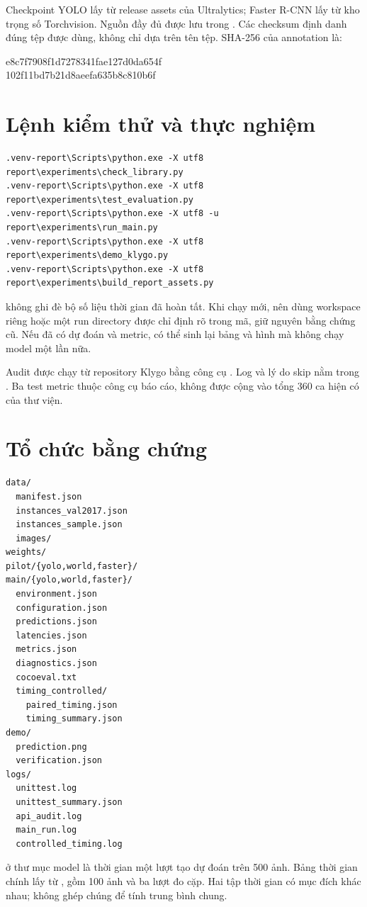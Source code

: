 Checkpoint YOLO lấy từ release assets của Ultralytics; Faster R-CNN lấy từ kho trọng số Torchvision. Nguồn đầy đủ được lưu trong . Các checksum định danh đúng tệp được dùng, không chỉ dựa trên tên tệp. SHA-256 của annotation là:
\begin{center}\footnotesize\ttfamily
e8c7f7908f1d7278341fae127d0da654f\\
102f11bd7b21d8aeefa635b8c810b6f
\end{center}
\begin{table}[H]\centering\footnotesize
\caption{SHA-256 của ba checkpoint; mỗi hash được chia hai dòng}

\end{table}

\section{Lệnh kiểm thử và thực nghiệm}
\label{sec:reproduce}
\begin{lstlisting}[language={},caption={Các lệnh dùng cho kết quả báo cáo}]
.venv-report\Scripts\python.exe -X utf8 report\experiments\check_library.py
.venv-report\Scripts\python.exe -X utf8 report\experiments\test_evaluation.py
.venv-report\Scripts\python.exe -X utf8 -u report\experiments\run_main.py
.venv-report\Scripts\python.exe -X utf8 report\experiments\demo_klygo.py
.venv-report\Scripts\python.exe -X utf8 report\experiments\build_report_assets.py
\end{lstlisting}
 không ghi đè bộ số liệu thời gian đã hoàn tất. Khi chạy mới, nên dùng workspace riêng hoặc một run directory được chỉ định rõ trong mã, giữ nguyên bằng chứng cũ. Nếu đã có dự đoán và metric, có thể sinh lại bảng và hình mà không chạy model một lần nữa.

Audit được chạy từ repository Klygo bằng công cụ . Log và lý do skip nằm trong . Ba test metric thuộc công cụ báo cáo, không được cộng vào tổng 360 ca hiện có của thư viện.

\section{Tổ chức bằng chứng}
\begin{lstlisting}[language={},caption={Các tệp bằng chứng chính trong artifacts/report}]
data/
  manifest.json
  instances_val2017.json
  instances_sample.json
  images/
weights/
pilot/{yolo,world,faster}/
main/{yolo,world,faster}/
  environment.json
  configuration.json
  predictions.json
  latencies.json
  metrics.json
  diagnostics.json
  cocoeval.txt
  timing_controlled/
    paired_timing.json
    timing_summary.json
demo/
  prediction.png
  verification.json
logs/
  unittest.log
  unittest_summary.json
  api_audit.log
  main_run.log
  controlled_timing.log
\end{lstlisting}
 ở thư mục model là thời gian một lượt tạo dự đoán trên 500 ảnh. Bảng thời gian chính lấy từ , gồm 100 ảnh và ba lượt đo cặp. Hai tập thời gian có mục đích khác nhau; không ghép chúng để tính trung bình chung.

